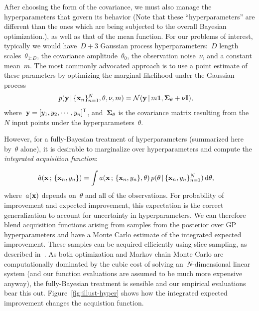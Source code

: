 \documentclass[aos,preprint]{imsart}
\begin{document}
After choosing the form of the covariance, we must also manage the
hyperparameters that govern its behavior (Note that these
``hyperparameters'' are different than the ones which are being
subjected to the overall Bayesian optimization.), as well as that of
the mean function.  For our problems of interest, typically we
would have~${D+3}$ Gaussian process hyperparameters:~$D$ length
scales~$\theta_{1:D}$, the covariance amplitude~$\theta_0$, the
observation noise~$\nu$, and a constant mean~$m$.  The most commonly
advocated approach is to use a point estimate of these parameters by
optimizing the marginal likelihood under the Gaussian
process
\begin{align*}
p(\brmy\given\{\brmx_n\}^N_{n=1},\theta,\nu,m) &=
  \distNorm(\brmy\given m\boldsymbol{1}, \bSigma_\theta + \nu\bI),
\end{align*}
where~${\boldsymbol{\mathrm{y}}=[y_1, y_2, \cdots, y_n]^{\sf{T}}}$, and~$\boldsymbol{\Sigma}_\theta$
is the covariance matrix resulting from the~$N$ input points under the
hyperparameters~$\theta$.

However, for a fully-Bayesian treatment of hyperparameters (summarized
here by~$\theta$ alone), it is desirable to marginalize over
hyperparameters and compute the \emph{integrated acquisition
  function}:

\begin{align}
  \hat{a}(\brmx\,;\,\{\brmx_n,y_n\}) &= \int a(\brmx\aqhist)\,p(\theta\given\{\brmx_n,y_n\}^N_{n=1})\,
  \mathrm{d}\theta,
\end{align}
where~$a(\boldsymbol{\mathrm{x}})$ depends on~$\theta$ and all of the observations.  For
probability of improvement and expected improvement, this expectation
is the correct generalization to account for uncertainty in
hyperparameters.  We can therefore blend acquisition functions arising
from samples from the posterior over GP hyperparameters and have a
Monte Carlo estimate of the integrated expected improvement.  These
samples can be acquired efficiently using slice sampling, as described
in~\citet{Murray-Adams-2010a}.  As both optimization
and Markov chain Monte Carlo are computationally dominated by the
cubic cost of solving an~$N$-dimensional linear system (and our
function evaluations are assumed to be much more expensive anyway),
the fully-Bayesian treatment is sensible and our empirical evaluations
bear this out.  Figure~\ref{fig:illust-hyper} shows how the integrated
expected improvement changes the acquistion function.
\end{document}
